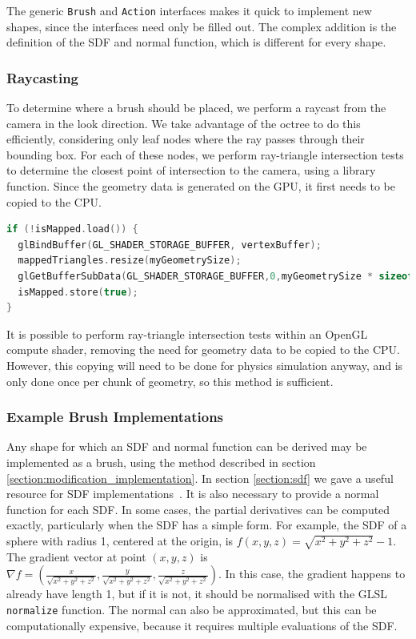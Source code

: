 \documentclass[11pt]{article}
\begin{document}
The generic \texttt{Brush} and \texttt{Action} interfaces makes it quick to implement new shapes, since the interfaces need only be filled out. The complex addition is the definition of the SDF and normal function, which is different for every shape.

\subsubsection{Raycasting}
\label{section:raycasting}
To determine where a brush should be placed, we perform a raycast from the camera in the look direction. We take advantage of the octree to do this efficiently, considering only leaf nodes where the ray passes through their bounding box. For each of these nodes, we perform ray-triangle intersection tests to determine the closest point of intersection to the camera, using a library function. Since the geometry data is generated on the GPU, it first needs to be copied to the CPU.

\begin{lstlisting}[language=C++,label={mapgeometry},caption={Snippet from the procedure \texttt{mapGeometry} to copy geometry data for a chunk from the GPU to the array \texttt{mappedTriangles}. \texttt{isMapped} is an atomic boolean storing whether \texttt{mapGeometry} has already been called for this chunk.}]
if (!isMapped.load()) {
  glBindBuffer(GL_SHADER_STORAGE_BUFFER, vertexBuffer);
  mappedTriangles.resize(myGeometrySize);
  glGetBufferSubData(GL_SHADER_STORAGE_BUFFER,0,myGeometrySize * sizeof(glm::vec4),mappedTriangles.data());
  isMapped.store(true);
}
\end{lstlisting}

It is possible to perform ray-triangle intersection tests within an OpenGL compute shader, removing the need for geometry data to be copied to the CPU. However, this copying will need to be done for physics simulation anyway, and is only done once per chunk of geometry, so this method is sufficient.

\subsubsection{Example Brush Implementations}
\label{example_brushes}
Any shape for which an SDF and normal function can be derived may be implemented as a brush, using the method described in section \ref{section:modification_implementation}. In section \ref{section:sdf} we gave a useful resource for SDF implementations~\cite{quilez:sdf}.
It is also necessary to provide a normal function for each SDF. In some cases, the partial derivatives can be computed exactly, particularly when the SDF has a simple form. For example, the SDF of a sphere with radius 1, centered at the origin, is $f\left(x,y,z\right) = \sqrt{x^2+y^2+z^2}-1$. The gradient vector at point $\left(x,y,z\right)$ is $\nabla f = \left(\frac{x}{\sqrt{x^2+y^2+z^2}},\frac{y}{\sqrt{x^2+y^2+z^2}},\frac{z}{\sqrt{x^2+y^2+z^2}}\right)$. In this case, the gradient happens to already have length 1, but if it is not, it should be normalised with the GLSL \texttt{normalize} function. 
The normal can also be approximated, but this can be computationally expensive, because it requires multiple evaluations of the SDF.
\end{document}

